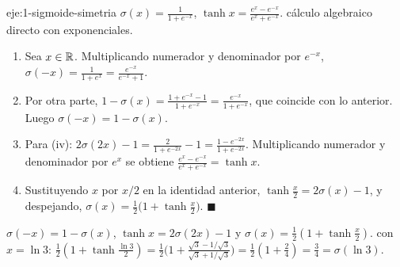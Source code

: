 \begin{solucion}{eje:1-sigmoide-simetria}
\datos $\sigma(x)=\frac{1}{1+e^{-x}}$, $\tanh x=\frac{e^{x}-e^{-x}}{e^{x}+e^{-x}}$.
\planteamiento cálculo algebraico directo con exponenciales.
\pasos
\begin{enumerate}[label=\arabic*.]
  \item Sea $x\in\mathbb{R}$. Multiplicando numerador y denominador por $e^{-x}$, $\sigma(-x)=\frac{1}{1+e^{x}}=\frac{e^{-x}}{e^{-x}+1}$.
  \item Por otra parte, $1-\sigma(x)=\frac{1+e^{-x}-1}{1+e^{-x}}=\frac{e^{-x}}{1+e^{-x}}$, que coincide con lo anterior. Luego $\sigma(-x)=1-\sigma(x)$.
  \item Para (iv): $2\sigma(2x)-1=\frac{2}{1+e^{-2x}}-1=\frac{1-e^{-2x}}{1+e^{-2x}}$. Multiplicando numerador y denominador por $e^{x}$ se obtiene $\frac{e^{x}-e^{-x}}{e^{x}+e^{-x}}=\tanh x$.
  \item Sustituyendo $x$ por $x/2$ en la identidad anterior, $\tanh\frac x2=2\sigma(x)-1$, y despejando, $\sigma(x)=\frac12\bigl(1+\tanh\frac x2\bigr)$. \hfill$\blacksquare$
\end{enumerate}
\resultado $\sigma(-x)=1-\sigma(x)$, $\tanh x=2\sigma(2x)-1$ y $\sigma(x)=\frac12(1+\tanh\frac x2)$.
\comprobacion con $x=\ln3$: $\frac12(1+\tanh\frac{\ln3}{2})=\frac12\bigl(1+\frac{\sqrt3-1/\sqrt3}{\sqrt3+1/\sqrt3}\bigr)=\frac12(1+\frac{2}{4})=\frac34=\sigma(\ln3)$.
\end{solucion}

